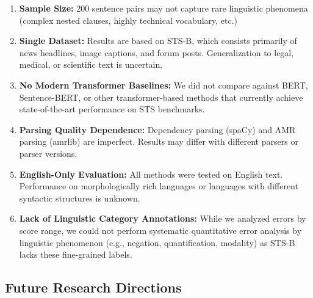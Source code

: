 \documentclass[11pt,a4paper]{article}
\begin{document}
\begin{enumerate}
    \item \textbf{Sample Size:} 200 sentence pairs may not capture rare linguistic phenomena (complex nested clauses, highly technical vocabulary, etc.)
    
    \item \textbf{Single Dataset:} Results are based on STS-B, which consists primarily of news headlines, image captions, and forum posts. Generalization to legal, medical, or scientific text is uncertain.
    
    \item \textbf{No Modern Transformer Baselines:} We did not compare against BERT, Sentence-BERT, or other transformer-based methods that currently achieve state-of-the-art performance on STS benchmarks.
    
    \item \textbf{Parsing Quality Dependence:} Dependency parsing (spaCy) and AMR parsing (amrlib) are imperfect. Results may differ with different parsers or parser versions.
    
    \item \textbf{English-Only Evaluation:} All methods were tested on English text. Performance on morphologically rich languages or languages with different syntactic structures is unknown.
    
    \item \textbf{Lack of Linguistic Category Annotations:} While we analyzed errors by score range, we could not perform systematic quantitative error analysis by linguistic phenomenon (e.g., negation, quantification, modality) as STS-B lacks these fine-grained labels.
\end{enumerate}

\subsection{Future Research Directions}
\end{document}
